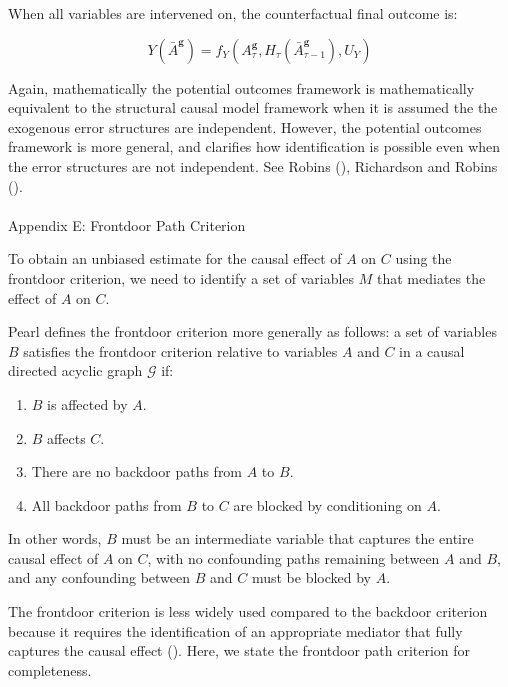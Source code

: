 \documentclass[
  single column]{article}
\makeatletter
\let\oldparagraph\paragraph
\renewcommand{\paragraph}{
    \@ifstar
      \xxxParagraphStar
      \xxxParagraphNoStar
  }
\newcommand{\xxxParagraphStar}[1]{\oldparagraph*{#1}\mbox{}}
\newcommand{\xxxParagraphNoStar}[1]{\oldparagraph{#1}\mbox{}}
\providecommand{\tightlist}{%
  \setlength{\itemsep}{0pt}\setlength{\parskip}{0pt}}\usepackage{longtable,booktabs,array}
\makeatother
\begin{document}
When all variables are intervened on, the counterfactual final outcome
is:

\[
Y(\bar{A}^\mathbf{g}) = f_Y(A^\mathbf{g}_\tau, H_\tau(\bar{A}^\mathbf{g}_{\tau-1}), U_{Y})
\]

Again, mathematically the potential outcomes framework is mathematically
equivalent to the structural causal model framework when it is assumed
the the exogenous error structures are independent. However, the
potential outcomes framework is more general, and clarifies how
identification is possible even when the error structures are not
independent. See Robins (), Richardson
and Robins ().

\newpage{}

\paragraph{Appendix E: Frontdoor Path Criterion}\label{id-app-e}

To obtain an unbiased estimate for the causal effect of \(A\) on \(C\)
using the frontdoor criterion, we need to identify a set of variables
\(M\) that mediates the effect of \(A\) on \(C\).

Pearl defines the frontdoor criterion more generally as follows: a set
of variables \(B\) satisfies the frontdoor criterion relative to
variables \(A\) and \(C\) in a causal directed acyclic graph
\(\mathcal{G}\) if:

\begin{enumerate}
\def\labelenumi{\arabic{enumi}.}
\tightlist
\item
  \(B\) is affected by \(A\).
\item
  \(B\) affects \(C\).
\item
  There are no backdoor paths from \(A\) to \(B\).
\item
  All backdoor paths from \(B\) to \(C\) are blocked by conditioning on
  \(A\).
\end{enumerate}

In other words, \(B\) must be an intermediate variable that captures the
entire causal effect of \(A\) on \(C\), with no confounding paths
remaining between \(A\) and \(B\), and any confounding between \(B\) and
\(C\) must be blocked by \(A\).

The frontdoor criterion is less widely used compared to the backdoor
criterion because it requires the identification of an appropriate
mediator that fully captures the causal effect
(). Here, we state the frontdoor
path criterion for completeness.
\end{document}
